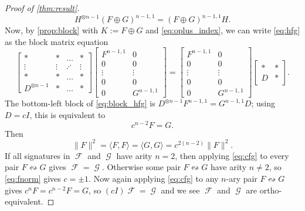 \documentclass{article}
\theoremstyle{remark}
\theoremstyle{definition}
\DeclareMathOperator{\fc}{\mathcal{F}}
\DeclareMathOperator{\gc}{\mathcal{G}}
\begin{document}
\begin{proof}[Proof of \autoref{thm:result}]
\begin{equation}
        H^{\otimes n-1}(F\oplus G)^{n-1,1} = (F\oplus G)^{n-1,1} H.
        \label{eq:hfg}
    \end{equation}
    Now, by \autoref{prop:block} with $K := F \oplus G$ and \eqref{eq:oplus_index},
    we can write \eqref{eq:hfg} as the block matrix equation
    \begin{equation}
        \label{eq:block_hfg}
        \begin{bmatrix} 
            * & * & \ldots & * \\
            \vdots & \vdots & \iddots & \vdots \\
            * & * & \ldots & *\\
            D^{\otimes n-1} & * & \ldots & *
        \end{bmatrix}
        \begin{bmatrix} 
            F^{n-1,1} & 0\\
            0 & 0\\
            \vdots & \vdots\\
            0 & 0\\
            0 & G^{n-1,1}
        \end{bmatrix}
        =
        \begin{bmatrix} 
            F^{n-1,1} & 0\\
            0 & 0\\
            \vdots & \vdots\\
            0 & 0\\
            0 & G^{n-1,1}
        \end{bmatrix}
        \begin{bmatrix}
            * & * \\
            D & *
        \end{bmatrix}.
    \end{equation}
    The bottom-left block of \eqref{eq:block_hfg} is 
    $D^{\otimes n-1} F^{n-1,1} = G^{n-1,1}D$; using $D = cI$, this is equivalent to
    \begin{equation}
        \label{eq:cfg}
        c^{n-2} F = G.
    \end{equation}
    Then
    \begin{equation}
        \label{eq:fnorm}
        \|F\|^2 = \langle F,F\rangle = \langle G,G\rangle = c^{2(n-2)}\|F\|^2.
    \end{equation}
    If all signatures in $\fc$ and $\gc$ have arity $n=2$, then applying \eqref{eq:cfg} to
    every pair $F \leftrightsquigarrow G$ gives $\fc = \gc$. Otherwise some pair 
    $F \leftrightsquigarrow G$ have arity $n \neq 2$, so \eqref{eq:fnorm} gives $c = \pm 1$.
    Now again applying \eqref{eq:cfg} to any $n$-ary pair $F \leftrightsquigarrow G$ gives
    $c^nF = c^{n-2}F = G$, so $(cI)\fc = \gc$ and we see $\fc$ and $\gc$ are ortho-equivalent.


\end{proof}
\end{document}
